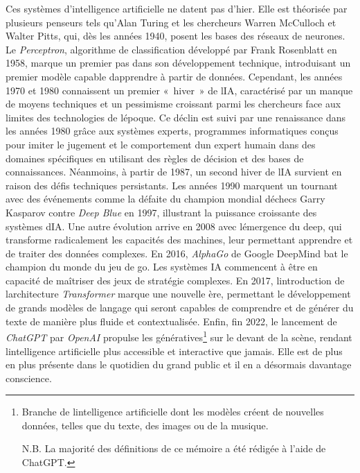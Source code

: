 	Ces systèmes d'intelligence artificielle ne datent pas
	d'hier. Elle est théorisée par plusieurs penseurs tels qu'Alan Turing
	et les chercheurs Warren McCulloch et Walter Pitts, qui, dès les années
	1940, posent les bases des réseaux de neurones. Le \emph{Perceptron},
	algorithme de classification développé par Frank Rosenblatt en 1958,
	marque un premier pas dans son développement technique, introduisant un premier modèle capable
	d\textquotesingle apprendre à partir de données. Cependant, les années
	1970 et 1980 connaissent un premier «~hiver~» de l\textquotesingle IA,
	caractérisé par un manque de moyens techniques et un pessimisme
	croissant parmi les chercheurs face aux limites des technologies de
	l\textquotesingle époque. Ce déclin est suivi par une renaissance dans
	les années 1980 grâce aux systèmes experts, programmes informatiques
	conçus pour imiter le jugement et le comportement d\textquotesingle un
	expert humain dans des domaines spécifiques en utilisant des règles de
	décision et des bases de connaissances. Néanmoins, à partir de 1987, un
	second hiver de l\textquotesingle IA survient en raison des défis
	techniques persistants. Les années 1990 marquent un tournant avec des
	événements comme la défaite du champion mondial
	d\textquotesingle échecs Garry Kasparov contre \emph{Deep Blue} en 1997,
	illustrant la puissance croissante des systèmes d\textquotesingle IA.
	Une autre évolution arrive en 2008 avec l\textquotesingle émergence du
	\gls{deep}, qui transforme radicalement les capacités des
	machines, leur permettant apprendre et de traiter des données complexes. En 2016,
	\emph{AlphaGo} de Google DeepMind bat le champion du monde du jeu
	de go. Les systèmes IA commencent à être en capacité de maîtriser des jeux de
	stratégie complexes. En 2017, l\textquotesingle introduction de
	l\textquotesingle architecture \emph{Transformer} marque une nouvelle
	ère, permettant le développement de grands modèles de langage qui seront
	capables de comprendre et de générer du texte de manière plus fluide et
	contextualisée. Enfin, fin 2022, le lancement de \emph{ChatGPT} par
	\emph{OpenAI} propulse les \gls{générative}s\footnote{Branche de
			l\textquotesingle intelligence artificielle dont les modèles créent de
			nouvelles données, telles que du texte, des images ou de la musique.\newline
	
	N.B. La majorité des définitions de ce mémoire a été rédigée à l'aide de 
	ChatGPT.	
	}
	sur le devant de la scène, rendant l\textquotesingle intelligence
	artificielle plus accessible et interactive que jamais.
	Elle est de plus en plus présente dans le quotidien du grand public 
	et il en a désormais davantage conscience.
	
